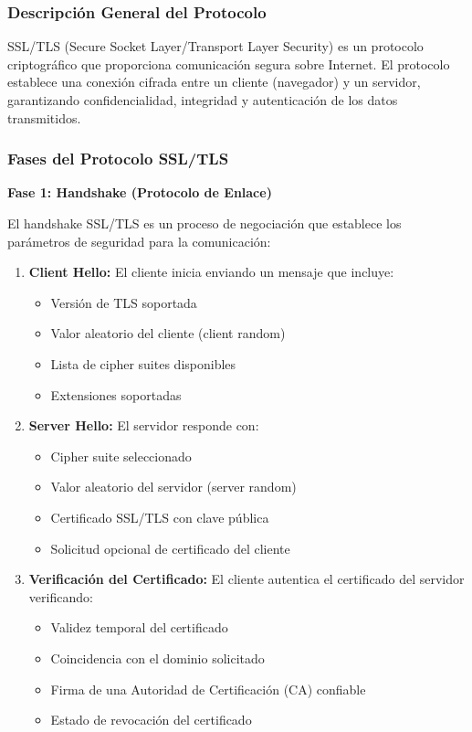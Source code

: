 {\subsubsection{Descripción General del Protocolo}

SSL/TLS (Secure Socket Layer/Transport Layer Security) es un protocolo criptográfico que proporciona comunicación segura sobre Internet. El protocolo establece una conexión cifrada entre un cliente (navegador) y un servidor, garantizando confidencialidad, integridad y autenticación de los datos transmitidos.

\subsubsection{Fases del Protocolo SSL/TLS}

\textbf{Fase 1: Handshake (Protocolo de Enlace)}

El handshake SSL/TLS es un proceso de negociación que establece los parámetros de seguridad para la comunicación:

\begin{enumerate}
    \item \textbf{Client Hello:} El cliente inicia enviando un mensaje que incluye:
    \begin{itemize}
        \item Versión de TLS soportada
        \item Valor aleatorio del cliente (client random)
        \item Lista de cipher suites disponibles
        \item Extensiones soportadas
    \end{itemize}
    
    \item \textbf{Server Hello:} El servidor responde con:
    \begin{itemize}
        \item Cipher suite seleccionado
        \item Valor aleatorio del servidor (server random)
        \item Certificado SSL/TLS con clave pública
        \item Solicitud opcional de certificado del cliente
    \end{itemize}
    
    \item \textbf{Verificación del Certificado:} El cliente autentica el certificado del servidor verificando:
    \begin{itemize}
        \item Validez temporal del certificado
        \item Coincidencia con el dominio solicitado
        \item Firma de una Autoridad de Certificación (CA) confiable
        \item Estado de revocación del certificado
    \end{itemize}
    

\end{enumerate}}
